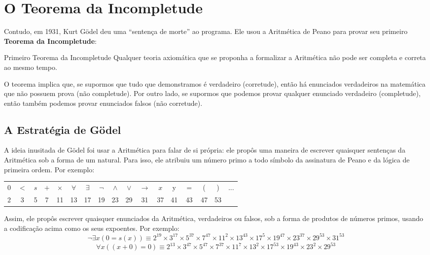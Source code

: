 \section{O Teorema da Incompletude}
Contudo, em 1931, Kurt Gödel deu uma ``sentença de morte'' ao programa. Ele usou a Aritmética de Peano para provar seu primeiro \textbf{Teorema da Incompletude}:

\begin{theorem}{Primeiro Teorema da Incompletude}
Qualquer teoria axiomática que se proponha a formalizar a Aritmética não pode ser completa e correta ao mesmo tempo.
\end{theorem}
O teorema implica que, se supormos que tudo que demonstramos é verdadeiro (corretude), então há enunciados verdadeiros na matemática que não possuem prova (não completude). Por outro lado, se supormos que podemos provar qualquer enunciado verdadeiro (completude), então também podemos provar enunciados falsos (não corretude). 

\subsection{A Estratégia de Gödel}
A ideia inusitada de Gödel foi usar a Aritmética para falar de si própria: ele propôs uma maneira de escrever quaisquer sentenças da Aritmética sob a forma de um natural. Para isso, ele atribuiu um número primo a todo símbolo da assinatura de Peano e da lógica de primeira ordem. Por exemplo:

\begin{table}[h]
    \centering
    \begin{tabular}{c c c c c c c c c c c c c c c c c}
        $0$ & $<$ & $s$ & $+$ & $\times$ & $\forall$ & $\exists$ & $\neg$ & $\land$ & $\lor$ & $\rightarrow$ & $x$ & y & $=$ & ( & ) &...
        \\
        2 & 3 & 5 & 7 & 11 & 13 & 17 & 19 & 23 & 29 & 31 & 37 & 41 & 43 & 47 & 53
    \end{tabular}    
\end{table}

Assim, ele propôs escrever quaisquer enunciados da Aritmética, verdadeiros ou falsos, sob a forma de produtos de números primos, usando a codificação acima como os seus expoentes. Por exemplo:
\[\neg \exists x(0 = s(x)) \equiv 2^{19} \times 3^{17} \times 5^{37} \times 7^{47} \times 11^{2} \times 13^{43} \times 17^5 \times 19^{47} \times 23^{37} \times 29^{53} \times 31^{53}\]
\[\forall x((x + 0) = 0) \equiv 2^{13} \times 3^{47} \times 5^{47} \times 7^{37} \times 11^{7} \times 13^{2} \times 17^{53} \times 19^{43} \times 23^{2} \times 29^{53}\]

